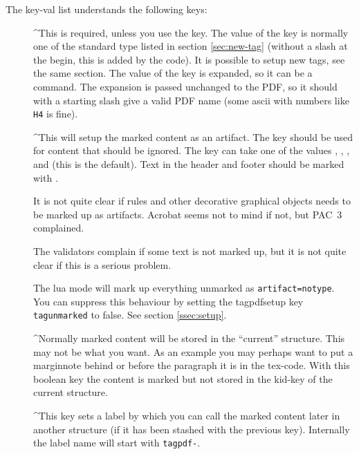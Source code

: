\documentclass[DIV=12,parskip=half-,bibliography=totoc]{scrartcl}
\newcommand\PDF{PDF}
\begin{document}
\TagP The key-val list understands the following keys:\TagPend
\begin{description}
  \item[]
  \TagP^This is required, unless you use the  key. The value of the key is normally one of the standard type listed in section \ref{sec:new-tag} (without a slash at the begin, this is added by the code). It is possible to setup new tags, see the same section. The value of the key is expanded, so it can be a command. The expansion is passed unchanged to the \PDF{}, so it should with a starting slash give a valid \PDF{} name  (some ascii with numbers like \texttt{H4} is fine).\Pmeti

  \item[]
  \TagP^This will setup the marked content as an artifact. The key should be used for content that should be ignored. The key can take one of the values , ,  ,   and  (this is the default). Text in the header and footer should be marked with .

  \TagP    It is not quite clear if rules and other decorative graphical objects needs to be marked up as artifacts. Acrobat seems not to mind if not, but PAC~3 complained.

  \TagP    The validators complain if some text is not marked up, but it is not quite clear if this is a serious problem.

  \TagP    The lua mode will mark up everything unmarked as \texttt{artifact=notype}. You can suppress this behaviour by setting the tagpdfsetup key \texttt{tagunmarked} to false. See section \ref{ssec:setup}.\Pmeti

  \item[]
   \TagP^Normally marked content will be stored in the \enquote{current} structure. This may not be what you want. As an example you may perhaps want to put a marginnote behind or before the paragraph it is in the tex-code. With this boolean key the content is marked but not stored in the kid-key of the current structure.\Pmeti

  \item[]
  \TagP^This key sets a label by which you can call the marked content later in another structure (if it has been stashed with the previous key). Internally the label name will start with \texttt{tagpdf-}.\Pmeti


\end{description}
\end{document}
